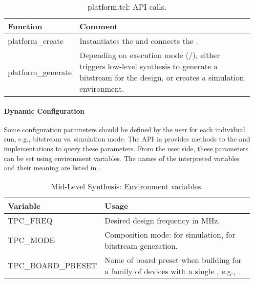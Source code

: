 %
\begin{longtable}[c]{>{\ttfamily}L{0.45\textwidth}L{0.45\textwidth}}
  \caption{platform.tcl: API calls.}
  \label{tbl:platform.tcl}\\
  \toprule
  \normalfont\textbf{Function} & \textbf{Comment}\\\midrule
  \endhead
  \bottomrule
  \endlastfoot
  platform\_create & Instantiates the  and connects the .\\\midrule
  platform\_generate & Depending on execution mode (/), either triggers low-level synthesis to generate a bitstream for the design, or creates a simulation environment.\\
\end{longtable}
%
\paragraph{Dynamic Configuration}
Some configuration parameters should be defined by the user for each individual run, e.g., bitstream vs. simulation mode.
The API in  provides methods to the  and  implementations to query these parameters.
From the user side, these parameters can be set using environment variables.
The names of the interpreted variables and their meaning are listed in .
%
\begin{longtable}[c]{>{\ttfamily}L{.35\textwidth}L{.55\textwidth}}
  \caption{Mid-Level Synthesis: Environment variables.}
  \label{tbl:mls-envvars}\\
  \toprule
  \normalfont\textbf{Variable} & \textbf{Usage} \\\midrule
  \endhead
  \bottomrule
  \endlastfoot
  TPC\_FREQ & Desired design frequency in MHz. \\\midrule
  TPC\_MODE & Composition mode:  for simulation,  for bitstream generation.\\\midrule
  TPC\_BOARD\_PRESET & Name of board preset when building for a family of devices with a single , e.g., .\\
\end{longtable}
